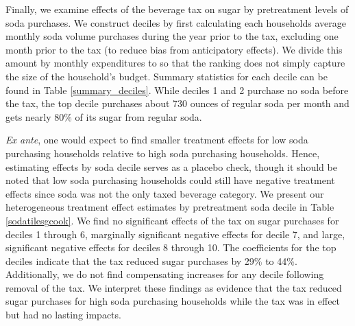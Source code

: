 \documentclass[12pt]{article}
\begin{document}
Finally, we examine effects of the beverage tax on sugar by pretreatment levels of soda purchases. We construct deciles by first calculating each households average monthly soda volume purchases during the year prior to the tax, excluding one month prior to the tax (to reduce bias from anticipatory effects). We divide this amount by monthly expenditures to so that the ranking does not simply capture the size of the household's budget. Summary statistics for each decile can be found in Table \ref{summary_deciles}. While deciles 1 and 2 purchase no soda before the tax, the top decile purchases about 730 ounces of regular soda per month and gets nearly 80\% of its sugar from regular soda.

\textit{Ex ante}, one would expect to find smaller treatment effects for low soda purchasing households relative to high soda purchasing households. Hence, estimating effects by soda decile serves as a placebo check, though it should be noted that low soda purchasing households could still have negative treatment effects since soda was not the only taxed beverage category. We present our heterogeneous treatment effect estimates by pretreatment soda decile in Table \ref{sodatilesgcook}. We find no significant effects of the tax on sugar purchases for deciles 1 through 6, marginally significant negative effects for decile 7, and large, significant negative effects for deciles 8 through 10. The coefficients for the top deciles indicate that the tax reduced sugar purchases by 29\% to 44\%. Additionally, we do not find compensating increases for any decile following removal of the tax. We interpret these findings as evidence that the tax reduced sugar purchases for high soda purchasing households while the tax was in effect but had no lasting impacts.

\end{document}
